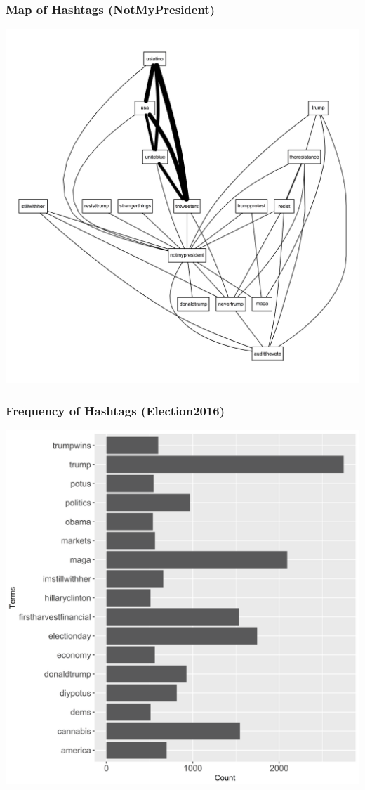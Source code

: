 \documentclass{beamer}
\begin{document}
\begin{frame}
	\frametitle{Map of Hashtags (NotMyPresident)}
  \includegraphics[height = 0.9\textheight]{nmphashmap}
\end{frame}

\begin{frame}
	\frametitle{Frequency of Hashtags (Election2016)}
  \includegraphics[height = 0.9\textheight]{e2016hashcount}
\end{frame}
\end{document}
